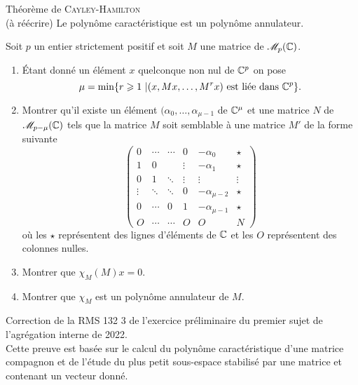 \begin{theo}
    Théorème de \textsc{Cayley}-\textsc{Hamilton} \\
    (à réécrire) Le polynôme caractéristique est un polynôme annulateur.
\end{theo}


\begin{exercice}
    Soit $p$ un entier strictement positif et soit $M$ une matrice de $\mathscr{M}_p(\mathbb{C})$.
    \begin{enumerate}
        \item Étant donné un élément $x$ quelconque non nul de $\mathbb{C}^p$ on pose
        $$\mu = \min \{ r \geqslant 1\ | (x, Mx, \dots, M^r x) \text{ est liée dans } \mathbb{C}^p\}.$$
        \item Montrer qu'il existe un élément $(\alpha_0, \dots, \alpha_{\mu-1}$ de $\mathbb{C}^{\mu}$ et une matrice $N$ de $\mathscr{M}_{p-\mu}(\mathbb{C})$ tels que la matrice $M$ soit semblable à une matrice $M'$ de la forme suivante
        $$
        \begin{pmatrix}
        0 & \cdots & \cdots & 0 & -\alpha_0 & \star \\
        1 & 0 & & \vdots & -\alpha_1 & \star \\
        0 & 1 & \ddots & \vdots & \vdots & \vdots \\
        \vdots & \ddots & \ddots & 0 & -\alpha_{\mu-2} & \star \\
        0 & \cdots & 0 & 1 & -\alpha_{\mu-1} & \star \\
        O & \cdots & \cdots & O & O & N
        \end{pmatrix}
        $$
        où les $\star$ représentent des lignes d'éléments de $\mathbb{C}$ et les $O$ représentent des colonnes nulles. 
        \item Montrer que $\chi_M(M)x = 0$.
        \item Montrer que $\chi_M$ est un polynôme annulateur de $M$.
    \end{enumerate}
\end{exercice}

\begin{preuve}
    Correction de la RMS 132 3 de l'exercice préliminaire du premier sujet de l'agrégation interne de 2022. \\
    Cette preuve est basée sur le calcul du polynôme caractéristique d'une matrice compagnon et de l'étude du plus petit sous-espace stabilisé par une matrice et contenant un vecteur donné. \\
    
    
\end{preuve}
